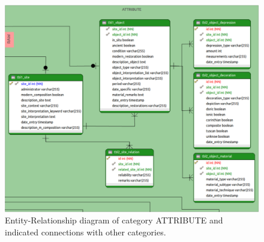 \begin{figure}[H]
\centering
\includegraphics[scale=0.35]{fig/database/ERDB_ATTRIBUTE_conn.pdf}
\caption{Entity-Relationship diagram of category  ATTRIBUTE and indicated connections with other categories.}
\label{fig:db_erdb_attribute}
\end{figure}
